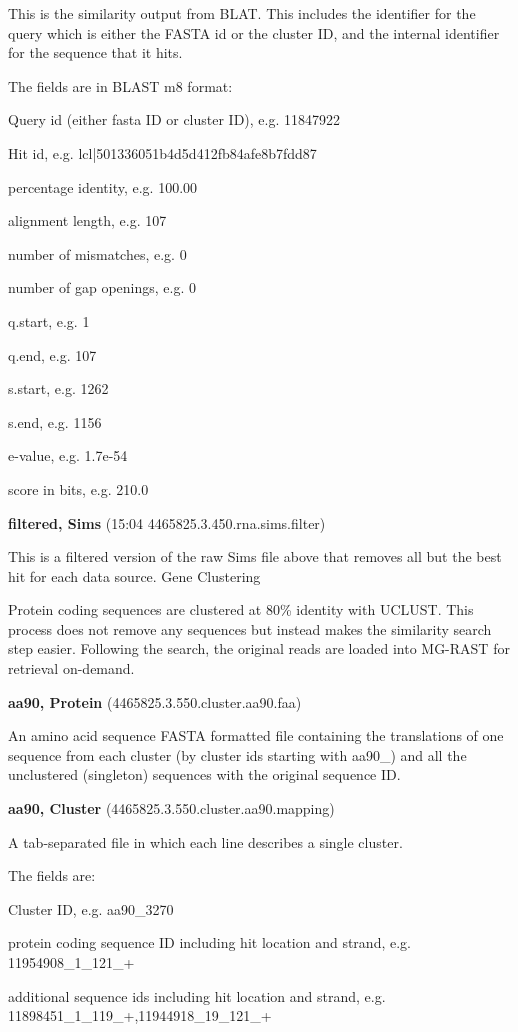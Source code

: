 \documentclass[12pt,fullpage]{report}
\begin{document}
\begin{mdframed}
This is the similarity output from BLAT. This includes the identifier for the query which is either the FASTA id or the cluster ID, and the internal identifier for the sequence that it hits.

The fields are in BLAST m8 format:

    Query id (either fasta ID or cluster ID), e.g. 11847922

    Hit id, e.g. lcl|501336051b4d5d412fb84afe8b7fdd87

    percentage identity, e.g. 100.00

    alignment length, e.g. 107

    number of mismatches, e.g. 0

    number of gap openings, e.g. 0

    q.start, e.g. 1

    q.end, e.g. 107

    s.start, e.g. 1262

    s.end, e.g. 1156

    e-value, e.g. 1.7e-54

    score in bits, e.g. 210.0


\textbf{filtered, Sims} (15:04 4465825.3.450.rna.sims.filter)

This is a filtered version of the raw Sims file above that removes all but the best hit for each data source.
Gene Clustering

Protein coding sequences are clustered at 80\% identity with UCLUST. This process does not remove any sequences but instead makes the similarity search step easier. Following the search, the original reads are loaded into MG-RAST for retrieval on-demand.

\textbf{aa90, Protein} (4465825.3.550.cluster.aa90.faa)

An amino acid sequence FASTA formatted file containing the translations of one sequence from each cluster (by cluster ids starting with aa90\_) and all the unclustered (singleton) sequences with the original sequence ID.

\textbf{aa90, Cluster} (4465825.3.550.cluster.aa90.mapping)

A tab-separated file in which each line describes a single cluster.

The fields are:

    Cluster ID, e.g. aa90\_3270

    protein coding sequence ID including hit location and strand, e.g. 11954908\_1\_121\_+

    additional sequence ids including hit location and strand, e.g. 11898451\_1\_119\_+,11944918\_19\_121\_+


\end{mdframed}
\end{document}
